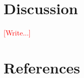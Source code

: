 \documentclass[aps,prd,amsmath,floatfix,twocolumn,superscriptaddress,nofootinbib,showpacs]{revtex4-1}
\theoremstyle{plain}
\theoremstyle{definition}
\newcommand{\note}[1]{\textcolor{Red}{[#1]}}
\begin{document}









\section{Discussion}
\label{sec:Discussion}
\note{Write...}

\newpage
\section*{References}


\end{document}
